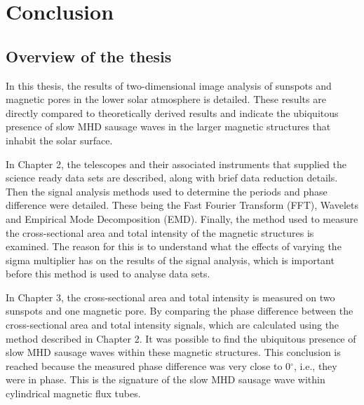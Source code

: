 \graphicspath{{Chapter6/Figs/}}

\chapter{Conclusion}
\label{chapter6}
    
    \vspace*{\fill}\par
    \pagebreak

\section{Overview of the thesis}
    
	In this thesis, the results of two-dimensional image analysis of sunspots and magnetic pores in the lower solar atmosphere is detailed.
    These results are directly compared to theoretically derived results and indicate the ubiquitous presence of slow MHD sausage waves in the larger magnetic structures that inhabit the solar surface.
    
    In Chapter 2, the telescopes and their associated instruments that supplied the science ready data sets are described, along with brief data reduction details.
    Then the signal analysis methods used to determine the periods and phase difference were detailed.
    These being the Fast Fourier Transform (FFT), Wavelets and Empirical Mode Decomposition (EMD).
    Finally, the method used to measure the cross-sectional area and total intensity of the magnetic structures is examined.
    The reason for this is to understand what the effects of varying the sigma multiplier has on the results of the signal analysis, which is important before this method is used to analyse data sets.
    
    In Chapter 3, the cross-sectional area and total intensity is measured on two sunspots and one magnetic pore.
    By comparing the phase difference between the cross-sectional area and total intensity signals, which are calculated using the method described in Chapter 2.
    It was possible to find the ubiquitous presence of slow MHD sausage waves within these magnetic structures.
    This conclusion is reached because the measured phase difference was very close to 0$^\circ$, i.e., they were in phase.
    This is the signature of the slow MHD sausage wave within cylindrical magnetic flux tubes.
    
